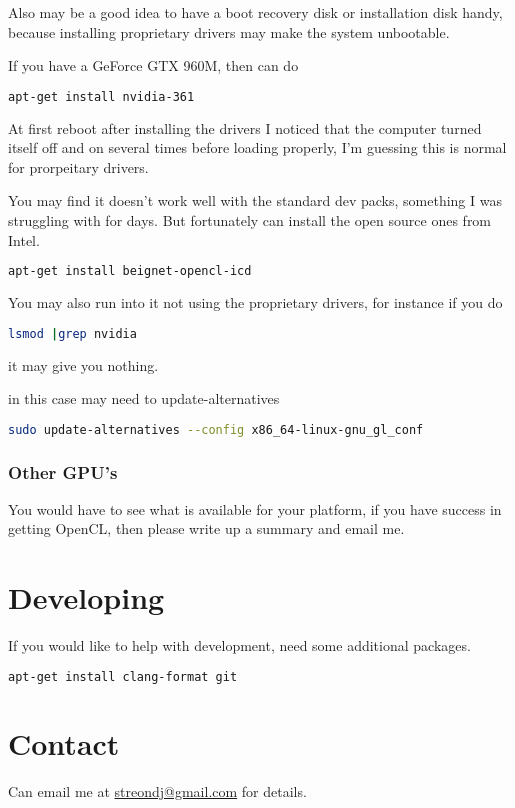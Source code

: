 \documentclass[12pt]{article}
\begin{document}
Also may be a good idea to have a boot recovery disk or installation disk handy,
because installing proprietary drivers may make the system unbootable. 

If you have a GeForce GTX 960M, then can do
\begin{lstlisting}[language=bash]
apt-get install nvidia-361 
\end{lstlisting}

At first reboot after installing the drivers I noticed that the computer turned
itself off and on several times before loading properly, I'm guessing this is
normal for prorpeitary drivers. 

You may find it doesn't work well with the standard dev packs, something I was
struggling with for days.  But fortunately can install the open source ones 
from Intel.

\begin{lstlisting}[language=bash]
apt-get install beignet-opencl-icd
\end{lstlisting}


You may also run into it not using the proprietary drivers, 
for instance if you do 
\begin{lstlisting}[language=bash]
lsmod |grep nvidia
\end{lstlisting}
it may give you nothing. 

in this case may need to update-alternatives
\begin{lstlisting}[language=bash]
sudo update-alternatives --config x86_64-linux-gnu_gl_conf
\end{lstlisting}


\subsubsection{Other GPU's}
You would have to see what is available for your platform,
if you have success in getting OpenCL, then please write up a summary and email
me.

\section{Developing}

If you would like to help with development, need some additional packages.
\begin{lstlisting}[language=bash]
apt-get install clang-format git
\end{lstlisting}

\section{Contact}
Can email me at \href{mailto:streondj@gmail.com}{streondj@gmail.com}
for details.
\end{document}
